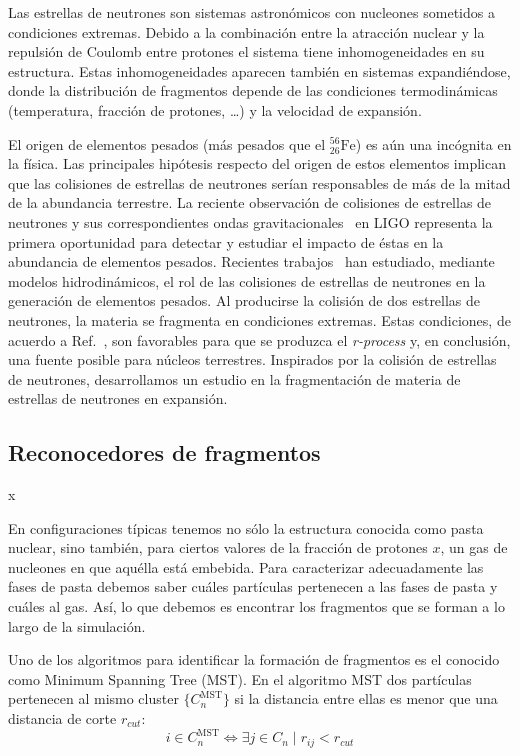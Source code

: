 Las estrellas de neutrones son sistemas astronómicos con nucleones sometidos a condiciones extremas.
Debido a la combinación entre la atracción nuclear y la repulsión de Coulomb entre protones el sistema tiene inhomogeneidades en su estructura.
Estas inhomogeneidades aparecen también en sistemas expandiéndose, donde la distribución de fragmentos depende de las condiciones termodinámicas (temperatura, fracción de protones, \ldots) y la velocidad de expansión.

El origen de elementos pesados (más pesados que el $^{56}_{26}\text{Fe}$) es aún una incógnita en la física.
Las principales hipótesis respecto del origen de estos elementos implican que las colisiones de estrellas de neutrones serían responsables de más de la mitad de la abundancia terrestre.
La reciente observación de colisiones de estrellas de neutrones y sus correspondientes ondas gravitacionales~\cite{ligo_scientific_collaboration_and_virgo_collaboration_gw170817:_2017} en LIGO representa la primera oportunidad para detectar y estudiar el impacto de éstas en la abundancia de elementos pesados.
Recientes trabajos~\cite{kasen_origin_2017} han estudiado, mediante modelos hidrodinámicos, el rol de las colisiones de estrellas de neutrones en la generación de elementos pesados.
Al producirse la colisión de dos estrellas de neutrones, la materia se fragmenta en condiciones extremas.
Estas condiciones, de acuerdo a Ref.~\cite{lattimer_black-hole-neutron-star_1974}, son favorables para que se produzca el \emph{r-process} y, en conclusión, una fuente posible para núcleos terrestres.
Inspirados por la colisión de estrellas de neutrones, desarrollamos un estudio en la fragmentación de materia de estrellas de neutrones en expansión.

\subsection{Reconocedores de fragmentos}x

En configuraciones típicas tenemos no sólo la estructura conocida como pasta nuclear, sino también, para ciertos valores de la fracción de protones $x$, un gas de nucleones en que aquélla está embebida.
Para caracterizar adecuadamente las fases de pasta debemos saber cuáles partículas pertenecen a las fases de pasta y cuáles al gas.
Así, lo que debemos es encontrar los fragmentos que se forman a lo largo de la simulación.

Uno de los algoritmos para identificar la formación de fragmentos es el conocido como Minimum Spanning Tree (MST).
En el algoritmo MST dos partículas pertenecen al mismo cluster $\{C^{\text{MST}}_n\}$ si la distancia entre ellas es menor que una distancia de corte $r_{cut}$:
\begin{equation*}
  i \in C^{\text{MST}}_n \Leftrightarrow \exists j \in C_n \mid
  r_{ij} < r_{cut}
\end{equation*}

